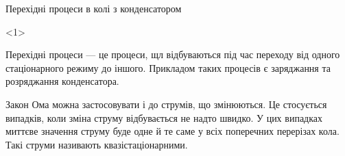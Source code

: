 \documentclass[onlytextwidth]{beamer}
\begin{document}
\begin{frame}{Перехідні процеси в колі з конденсатором}{}\small
	\begin{onlyenv}
		\begin{block}{}\justifying
			\alert{Перехідні процеси} --- це процеси, щл відбуваються під час переходу від одного стаціонарного режиму до іншого.
			Прикладом таких процесів є заряджання та розряджання конденсатора.
		\end{block}
		\begin{alertblock}{}\justifying
			Закон Ома можна застосовувати і до струмів, що змінюються. Це стосується випадків, коли зміна струму відбувається не надто швидко. У цих
			випадках \alert{миттєве значення струму буде одне й те саме у всіх поперечних перерізах кола}. Такі струми називають
			\alert{квазістаціонарними}.

			\bigskip


\end{alertblock}
\end{onlyenv}
\end{frame}
\end{document}
